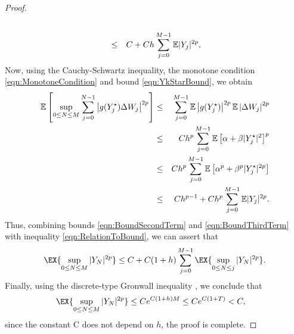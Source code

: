 \begin{proof}
\begin{eqnarray}
\notag\\
&\leq&
C 
+ 
C h 
\sum_{j=0}^{M-1}
\mathbb{E}|Y_j|^{2p},				
\end{eqnarray}
Now, using the Cauchy-Schwartz inequality, the monotone condition 
\eqref{eqn:MonotoneCondition} and bound \eqref{eqn:YkStarBound}, we obtain
\begin{eqnarray}
\m\left[
\sup_{0\leq N \leq M}
\sum_{j=0}^{N-1}
\left|
g(Y_j^{\star})\Delta W_j
\right|^{2p}	
\right]
&\leq&	
\sum_{j=0}^{M-1}
\m
\left|
g(Y_j^{\star})
\right|^{2p}
\m
\left|
\Delta W_j
\right|^{2p}
\notag \\
&\leq&
C h^p
\sum_{j=0}^{M-1}
\m
\left[
\alpha +\beta|Y^{\star}_j|^2
\right]^p
\notag\\
%
&\leq&
Ch^p
\sum_{j=0}^{M-1}
\m
\left[
\alpha ^p +\beta^p |Y^{\star}_j|^{2p}
\right]
\notag\\
&\leq&
Ch^{p-1}
+
Ch^p \sum_{j=0}^{M-1}
\m|Y_j|^{2p} \label{eqn:BoundThirdTerm}.
\end{eqnarray}
Thus, combining bounds \eqref{eqn:BoundSecondTerm} and \eqref{eqn:BoundThirdTerm} with inequality 
\eqref{eqn:RelationToBound}, we can assert that
\begin{align}
	\EX{
		\sup_{0\leq N \leq M}
		|Y_N|^{2p} 
	}
	\leq	
	C +C(1+h) 
	\sum_{j=0}^{M-1}
	\EX{
		\sup_{0\leq N \leq j}
		|Y_N|^{2p}
	}	
	.
\end{align}
Finally, using the discrete-type Gronwall inequality \cite{Mao2007}, we conclude that
\begin{align*}
	\EX{
		\sup_{0\leq N \leq M}
		|Y_N|^{2p} 
	}	
	&\leq
	C e^{C(1+h)M} 
	\leq 
	C e^{C(1+T)}<C,
\end{align*}
since the constant C does not depend on $h$, the proof is complete.
\end{proof}

	
